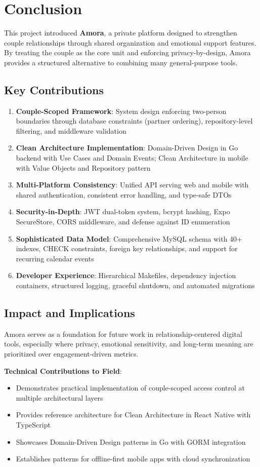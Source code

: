 \documentclass[sigconf, authorversion, nonacm, margin=0.75in]{acmart}
\begin{document}
\section{Conclusion}
This project introduced \textbf{Amora}, a private platform designed to strengthen couple relationships through shared organization and emotional support features. By treating the couple as the core unit and enforcing privacy-by-design, Amora provides a structured alternative to combining many general-purpose tools.

\subsection{Key Contributions}
\begin{enumerate}
    \item \textbf{Couple-Scoped Framework}: System design enforcing two-person boundaries through database constraints (partner ordering), repository-level filtering, and middleware validation
    \item \textbf{Clean Architecture Implementation}: Domain-Driven Design in Go backend with Use Cases and Domain Events; Clean Architecture in mobile with Value Objects and Repository pattern
    \item \textbf{Multi-Platform Consistency}: Unified API serving web and mobile with shared authentication, consistent error handling, and type-safe DTOs
    \item \textbf{Security-in-Depth}: JWT dual-token system, bcrypt hashing, Expo SecureStore, CORS middleware, and defense against ID enumeration
    \item \textbf{Sophisticated Data Model}: Comprehensive MySQL schema with 40+ indexes, CHECK constraints, foreign key relationships, and support for recurring calendar events
    \item \textbf{Developer Experience}: Hierarchical Makefiles, dependency injection containers, structured logging, graceful shutdown, and automated migrations
\end{enumerate}

\subsection{Impact and Implications}
Amora serves as a foundation for future work in relationship-centered digital tools, especially where privacy, emotional sensitivity, and long-term meaning are prioritized over engagement-driven metrics.

\textbf{Technical Contributions to Field}:
\begin{itemize}
    \item Demonstrates practical implementation of couple-scoped access control at multiple architectural layers
    \item Provides reference architecture for Clean Architecture in React Native with TypeScript
    \item Showcases Domain-Driven Design patterns in Go with GORM integration
    \item Establishes patterns for offline-first mobile apps with cloud synchronization
\end{itemize}
\end{document}

